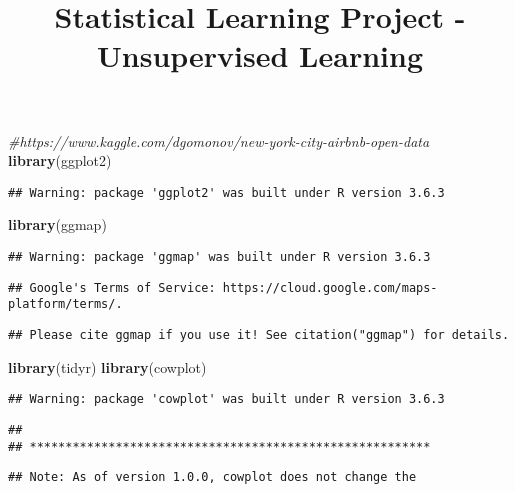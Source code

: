 \documentclass[
]{article}
\title{Statistical Learning Project - Unsupervised Learning}
\author{}
\date{\vspace{-2.5em}}
\newenvironment{Shaded}{\begin{snugshade}}{\end{snugshade}}
\newcommand{\CommentTok}[1]{\textcolor[rgb]{0.56,0.35,0.01}{\textit{#1}}}
\newcommand{\KeywordTok}[1]{\textcolor[rgb]{0.13,0.29,0.53}{\textbf{#1}}}
\newcommand{\NormalTok}[1]{#1}
\begin{document}
\maketitle

\begin{Shaded}
\begin{Highlighting}[]
\CommentTok{#https://www.kaggle.com/dgomonov/new-york-city-airbnb-open-data}
\KeywordTok{library}\NormalTok{(ggplot2)}
\end{Highlighting}
\end{Shaded}

\begin{verbatim}
## Warning: package 'ggplot2' was built under R version 3.6.3
\end{verbatim}

\begin{Shaded}
\begin{Highlighting}[]
\KeywordTok{library}\NormalTok{(ggmap)}
\end{Highlighting}
\end{Shaded}

\begin{verbatim}
## Warning: package 'ggmap' was built under R version 3.6.3
\end{verbatim}

\begin{verbatim}
## Google's Terms of Service: https://cloud.google.com/maps-platform/terms/.
\end{verbatim}

\begin{verbatim}
## Please cite ggmap if you use it! See citation("ggmap") for details.
\end{verbatim}

\begin{Shaded}
\begin{Highlighting}[]
\KeywordTok{library}\NormalTok{(tidyr)}
\KeywordTok{library}\NormalTok{(cowplot)}
\end{Highlighting}
\end{Shaded}

\begin{verbatim}
## Warning: package 'cowplot' was built under R version 3.6.3
\end{verbatim}

\begin{verbatim}
## 
## ********************************************************
\end{verbatim}

\begin{verbatim}
## Note: As of version 1.0.0, cowplot does not change the
\end{verbatim}
\end{document}
